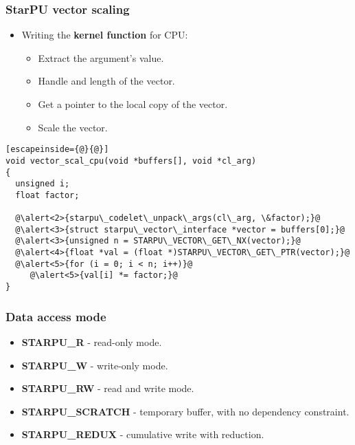 \begin{frame}
  \frametitle{StarPU vector scaling}
  \begin{itemize}
  \item Writing the {\bf kernel function} for CPU:
    \begin{itemize}
    \item<2-> Extract the argument's value.
    \item<3-> Handle and length of the vector.
    \item<4-> Get a pointer to the local copy of the vector.
    \item<5-> Scale the vector.
    \end{itemize}
  \end{itemize}
  \begin{block}{}
\begin{lstlisting}[escapeinside={@}{@}]
void vector_scal_cpu(void *buffers[], void *cl_arg)
{
  unsigned i;
  float factor;

  @\alert<2>{starpu\_codelet\_unpack\_args(cl\_arg, \&factor);}@
  @\alert<3>{struct starpu\_vector\_interface *vector = buffers[0];}@
  @\alert<3>{unsigned n = STARPU\_VECTOR\_GET\_NX(vector);}@
  @\alert<4>{float *val = (float *)STARPU\_VECTOR\_GET\_PTR(vector);}@
  @\alert<5>{for (i = 0; i < n; i++)}@
     @\alert<5>{val[i] *= factor;}@
}
\end{lstlisting}
  \end{block}
\end{frame}
\begin{frame}[fragile]
  \frametitle{Data access mode}
  \begin{itemize}
  \item \textbf{STARPU\_R} - read-only mode.
  \item \textbf{STARPU\_W} - write-only mode.
  \item \textbf{STARPU\_RW} -  read and write mode.
  \item \textbf{STARPU\_SCRATCH} - temporary buffer, with no dependency constraint.
  \item \textbf{STARPU\_REDUX} - cumulative write with reduction.
  \end{itemize}
\end{frame}

